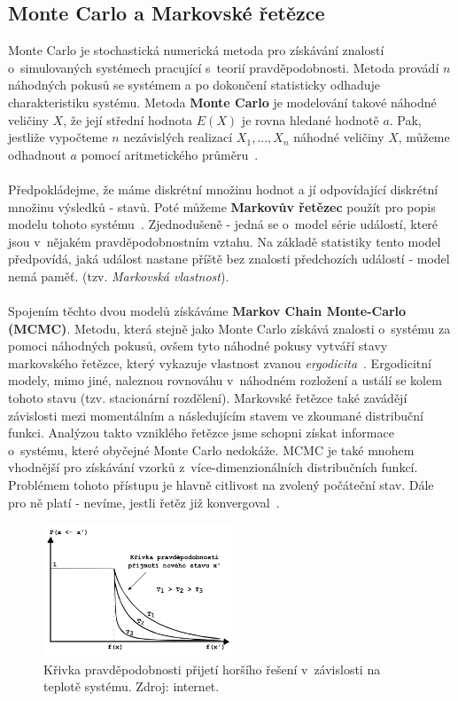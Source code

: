 \subsection{Monte Carlo a Markovské řetězce}
Monte Carlo je stochastická numerická metoda pro získávání znalostí o~simulovaných systémech pracující s~teorií pravděpodobnosti. Metoda provádí $n$ náhodných pokusů se systémem a po dokončení statisticky odhaduje charakteristiku systému. Metoda \textbf{Monte Carlo} je modelování takové náhodné veličiny $X$, že její střední hodnota $E(X)$ je rovna hledané hodnotě $a$. Pak, jestliže vypočteme $n$ nezávislých realizací $X_1, ..., X_n$ náhodné veličiny $X$, můžeme odhadnout $a$ pomocí aritmetického průměru~\cite{MonteCarlo}.
\\\\
 Předpokládejme, že máme diskrétní množinu hodnot a jí odpovídající diskrétní množinu výsledků - stavů. Poté můžeme \textbf{Markovův řetězec} použít pro popis modelu tohoto systému~\cite{NahodneProcesy, EVO}. Zjednodušeně - jedná se o~model série událostí, které jsou v~nějakém pravděpodobnostním vztahu. Na základě statistiky tento model předpovídá, jaká událost nastane příště bez znalosti předchozích událostí - model nemá paměť. (tzv. \textit{Markovská vlastnost}).
 \\\\
 Spojením těchto dvou modelů získáváme \textbf{Markov Chain Monte-Carlo (MCMC)}. Metodu, která stejně jako Monte Carlo získává znalosti o~systému za pomoci náhodných pokusů, ovšem tyto náhodné pokusy vytváří stavy markovského řetězce, který vykazuje vlastnost zvanou \textit{ergodicita}~\cite{EVO}. Ergodicitní modely, mimo jiné, naleznou rovnováhu v~náhodném rozložení a ustálí se kolem tohoto stavu (tzv. stacionární rozdělení). Markovské řetězce také zavádějí závislosti mezi momentálním a následujícím stavem ve zkoumané distribuční funkci. Analýzou takto vzniklého řetězce jsme schopni získat informace o~systému, které obyčejné Monte Carlo nedokáže. MCMC je také mnohem vhodnější pro získávání vzorků z~více-dimenzionálních distribučních funkcí. Problémem tohoto přístupu je hlavně citlivost na zvolený počáteční stav. Dále pro ně platí  - nevíme, jestli řetěz již konvergoval~\cite{webMCMC}.

\begin{figure}[hbt]
	\centering
	\includegraphics[width=0.5\textwidth]{obrazky-figures/cooling.pdf}
	\caption{Křivka pravděpodobnosti přijetí horšího řešení v~závislosti na teplotě systému. Zdroj: internet.}
	\label{fg:cooling}
\end{figure}

